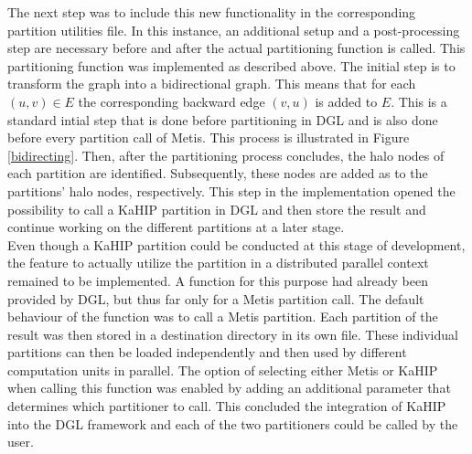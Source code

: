 \documentclass[acmsmall,nonacm,screen,review]{acmart}
\begin{document}
The next step was to include this new functionality in the corresponding partition utilities file. In this instance, an additional setup and a post-processing step are necessary before and after the actual partitioning function is called. This partitioning function was implemented as described above. The initial step is to transform the graph into a bidirectional graph. This means that for each $(u,v) \in E$ the corresponding backward edge $(v,u)$ is added to $E$. This is a standard intial step that is done before partitioning in DGL and is also done before every partition call of Metis. This process is illustrated in Figure \ref{bidirecting}. Then, after the partitioning process concludes, the halo nodes of each partition are identified. Subsequently, these nodes are added as to the partitions' halo nodes, respectively. This step in the implementation opened the possibility to call a KaHIP partition in DGL and then store the result and continue working on the different partitions at a later stage. \\
Even though a KaHIP partition could be conducted at this stage of development, the feature to actually utilize the partition in a distributed parallel context remained to be implemented. A function for this purpose had already been provided by DGL, but thus far only for a Metis partition call. The default behaviour of the function was to call a Metis partition. Each partition of the result was then stored in a destination directory in its own file. These individual partitions can then be loaded independently and then used by different computation units in parallel. The option of selecting either Metis or KaHIP when calling this function was enabled by adding an additional parameter that determines which partitioner to call. This concluded the integration of KaHIP into the DGL framework and each of the two partitioners could be called by the user.
\end{document}
